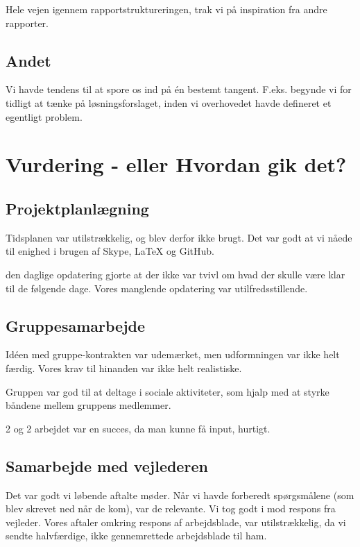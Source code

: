 Hele vejen igennem rapportstruktureringen, trak vi på inspiration fra andre rapporter.

\subsection{Andet}

Vi havde tendens til at spore os ind på én bestemt tangent. F.eks. begynde vi for tidligt at tænke på løsningsforslaget, inden vi overhovedet havde defineret et egentligt problem.

\section{Vurdering - eller Hvordan gik det?}

\subsection{Projektplanlægning}

Tidsplanen var utilstrækkelig, og blev derfor ikke brugt. Det var godt at vi nåede til enighed i brugen af Skype, LaTeX og GitHub.

den daglige opdatering gjorte at der ikke var tvivl om hvad der skulle være klar til de følgende dage. Vores manglende opdatering var utilfredsstillende. 

\subsection{Gruppesamarbejde}

Idéen med gruppe-kontrakten var udemærket, men udformningen var ikke helt færdig. Vores krav til hinanden var ikke helt realistiske.

Gruppen var god til at deltage i sociale aktiviteter, som hjalp med at styrke båndene mellem gruppens medlemmer.

2 og 2 arbejdet var en succes, da man kunne få input, hurtigt.


\subsection{Samarbejde med vejlederen}

Det var godt vi løbende aftalte møder. Når vi havde forberedt spørgsmålene (som blev skrevet ned når de kom), var de relevante. Vi tog godt i mod respons fra vejleder. Vores aftaler omkring respons af arbejdsblade, var utilstrækkelig, da vi sendte halvfærdige, ikke gennemrettede arbejdsblade til ham.

